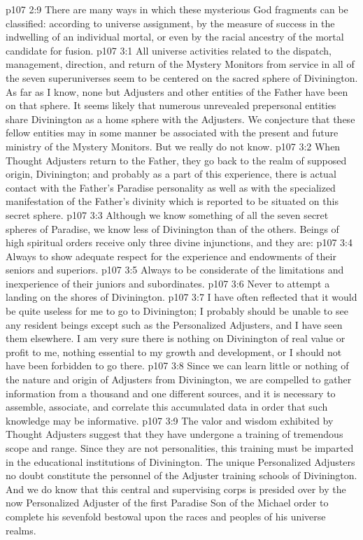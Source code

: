 \pc \vs p107 2:9 There are many ways in which these mysterious God fragments can be classified: according to universe assignment, by the measure of success in the indwelling of an individual mortal, or even by the racial ancestry of the mortal candidate for fusion.
\vs p107 3:1 All universe activities related to the dispatch, management, direction, and return of the Mystery Monitors from service in all of the seven superuniverses seem to be centered on the sacred sphere of Divinington. As far as I know, none but Adjusters and other entities of the Father have been on that sphere. It seems likely that numerous unrevealed prepersonal entities share Divinington as a home sphere with the Adjusters. We conjecture that these fellow entities may in some manner be associated with the present and future ministry of the Mystery Monitors. But we really do not know.
\vs p107 3:2 When Thought Adjusters return to the Father, they go back to the realm of supposed origin, Divinington; and probably as a part of this experience, there is actual contact with the Father’s Paradise personality as well as with the specialized manifestation of the Father’s divinity which is reported to be situated on this secret sphere.
\vs p107 3:3 Although we know something of all the seven secret spheres of Paradise, we know less of Divinington than of the others. Beings of high spiritual orders receive only three divine injunctions, and they are:
\pc \vs p107 3:4 \bibnobreakspace Always to show adequate respect for the experience and endowments of their seniors and superiors.
\vs p107 3:5 \bibnobreakspace Always to be considerate of the limitations and inexperience of their juniors and subordinates.
\vs p107 3:6 \bibnobreakspace Never to attempt a landing on the shores of Divinington.
\vs p107 3:7 I have often reflected that it would be quite useless for me to go to Divinington; I probably should be unable to see any resident beings except such as the Personalized Adjusters, and I have seen them elsewhere. I am very sure there is nothing on Divinington of real value or profit to me, nothing essential to my growth and development, or I should not have been forbidden to go there.
\vs p107 3:8 Since we can learn little or nothing of the nature and origin of Adjusters from Divinington, we are compelled to gather information from a thousand and one different sources, and it is necessary to assemble, associate, and correlate this accumulated data in order that such knowledge may be informative.
\vs p107 3:9 The valor and wisdom exhibited by Thought Adjusters suggest that they have undergone a training of tremendous scope and range. Since they are not personalities, this training must be imparted in the educational institutions of Divinington. The unique Personalized Adjusters no doubt constitute the personnel of the Adjuster training schools of Divinington. And we do know that this central and supervising corps is presided over by the now Personalized Adjuster of the first Paradise Son of the Michael order to complete his sevenfold bestowal upon the races and peoples of his universe realms.
